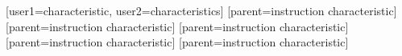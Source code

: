 
%
        [user1={characteristic}, user2={characteristics}]
%
        [parent={instruction characteristic}]
%
        [parent={instruction characteristic}]
%
        [parent={instruction characteristic}]
%
        [parent={instruction characteristic}]
%
        [parent={instruction characteristic}]
